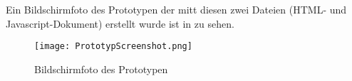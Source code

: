 Ein Bildschirmfoto des Prototypen der mitt diesen zwei Dateien (HTML- und Javascript-Dokument) erstellt wurde ist in  zu sehen.

\begin{figure}[htb]
\centering
\texttt{[image: PrototypScreenshot.png]}
\caption[PrototypScreenshot]{Bildschirmfoto des Prototypen}
\label{fig:PrototypScreenshot}
\end{figure}